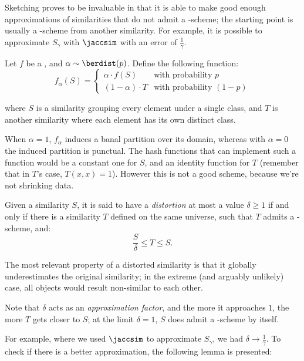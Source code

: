 Sketching proves to be invaluable in that it is able to make good enough approximations of similarities that do not admit a \lsh-scheme; the starting point is usually a \lsh-scheme from another similarity. For example, it is possible to approximate $S_\gamma$ with $\jaccsim$ with an error of $\frac{1}{\gamma}$.

\begin{example}
    Let $f$ be a \pgf, and $\alpha \sim \berdist(p)$. Define the following function:
    \[
        f_\alpha(S) = \begin{cases}
            \alpha \cdot f(S)		& \text{with probability $p$} \\
            (1 - \alpha) \cdot T	& \text{with probability $(1 - p)$}
        \end{cases}
    \]

    where $S$ is a similarity grouping every element under a single class, and $T$ is another similarity where each element has its own distinct class.

    When $\alpha = 1$, $f_\alpha$ induces a banal partition over its domain, whereas with $\alpha = 0$ the induced partition is punctual. The hash functions that can implement such a function would be a constant one for $S$, and an identity function for $T$ (remember that in $T$'s case, $T(x, x) = 1$). However this is not a good scheme, because we're not shrinking data.

\end{example}

\begin{definition}[Distortion]
    Given a similarity $S$, it is said to have a \emph{distortion} at most a value $\delta \geq 1$ if and only if there is a similarity $T$ defined on the same universe, such that $T$ admits a \lsh-scheme, and:
    \[
        \frac{S}{\delta} \leq T \leq S.
    \]
\end{definition}

The most relevant property of a distorted similarity is that it globally underestimates the original similarity; in the extreme (and arguably unlikely) case, all objects would result non-similar to each other.

Note that $\delta$ acts as an \emph{approximation factor}, and the more it approaches $1$, the more $T$ gets closer to $S$; at the limit $\delta = 1$, $S$ does admit a \lsh-scheme by itself.

For example, where we used $\jaccsim$ to approximate $S_\gamma$, we had $\delta \to \frac{1}{\gamma}$. To check if there is a better approximation, the following lemma is presented:

